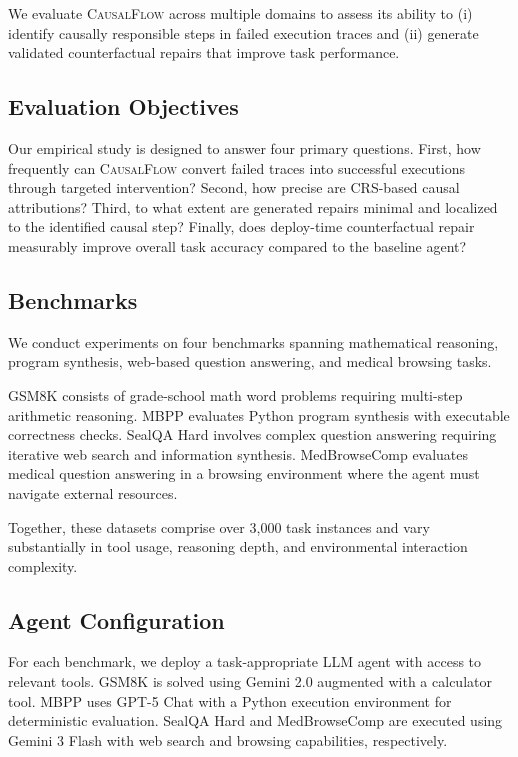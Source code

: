 \documentclass{article}
\theoremstyle{plain}
\theoremstyle{definition}
\theoremstyle{remark}
\begin{document}
We evaluate \textsc{CausalFlow} across multiple domains to assess its ability to (i) identify causally responsible steps in failed execution traces and (ii) generate validated counterfactual repairs that improve task performance.

\subsection{Evaluation Objectives}

Our empirical study is designed to answer four primary questions. First, how frequently can \textsc{CausalFlow} convert failed traces into successful executions through targeted intervention? Second, how precise are CRS-based causal attributions? Third, to what extent are generated repairs minimal and localized to the identified causal step? Finally, does deploy-time counterfactual repair measurably improve overall task accuracy compared to the baseline agent?

\subsection{Benchmarks}

We conduct experiments on four benchmarks spanning mathematical reasoning, program synthesis, web-based question answering, and medical browsing tasks.

GSM8K \cite{cobbe2021gsm8k} consists of grade-school math word problems requiring multi-step arithmetic reasoning. MBPP \cite{austin2021program} evaluates Python program synthesis with executable correctness checks. SealQA Hard \cite{pham2025sealqa} involves complex question answering requiring iterative web search and information synthesis. MedBrowseComp \cite{chen2025medbrowsecomp} evaluates medical question answering in a browsing environment where the agent must navigate external resources.

Together, these datasets comprise over 3,000 task instances and vary substantially in tool usage, reasoning depth, and environmental interaction complexity.

\subsection{Agent Configuration}

For each benchmark, we deploy a task-appropriate LLM agent with access to relevant tools. GSM8K is solved using Gemini 2.0 augmented with a calculator tool. MBPP uses GPT-5 Chat with a Python execution environment for deterministic evaluation. SealQA Hard and MedBrowseComp are executed using Gemini 3 Flash with web search and browsing capabilities, respectively.
\end{document}
